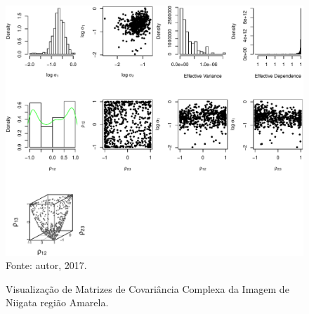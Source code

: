 \documentclass[journal]{IEEEtran}
\begin{document}







\newpage

\begin{figure}[ht]
\centering
\caption{Visualização de Matrizes de Covariância Complexa da Imagem de Niigata região Amarela.}
\includegraphics[width=\linewidth]{../../Figuras/Amostras-Niigata/Niigata-Amarela-500.pdf}\\
Fonte: autor, 2017.
\label{visNiigata1}
\end{figure}

\newpage
\end{document}
